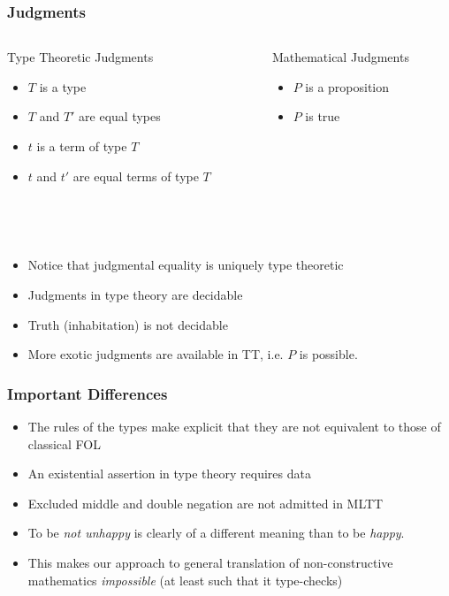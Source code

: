 \documentclass{beamer}
\begin{document}
\begin{frame}

\frametitle{Judgments}

\begin{columns}

\begin{column}{0.4 \textwidth}
\begin{block}{Type Theoretic Judgments}
  \begin{itemize}
  \item $T$ is a type
  \item $T$ and $T'$ are equal types
  \item $t$ is a term of type $T$
  \item $t$ and $t'$ are equal terms of type $T$
  \end{itemize}
\end{block}
\end{column}

\begin{column}{0.4 \textwidth}
\begin{block}{Mathematical Judgments}
  \begin{itemize}
  \item $P$ is a proposition
  \item $P$ is true
  \end{itemize}
\end{block}
\end{column}
\end{columns}

\\~\\
\begin{itemize}
  \item Notice that judgmental equality is uniquely type theoretic
  \item Judgments in type theory are decidable
  \item Truth (inhabitation) is not decidable
  \item More exotic judgments are available in TT, i.e. $P$ is possible.
\end{itemize}

\end{frame}


\begin{frame}

\frametitle{Important Differences}

\begin{itemize}
\item The rules of the types make explicit that they are not equivalent to those
  of classical FOL
\item An existential assertion in type theory requires data
\item Excluded middle and double negation are not admitted in MLTT
\item To be \emph{not unhappy} is clearly of a different meaning than to be \emph{happy}.
\item This makes our approach to general translation of non-constructive mathematics \emph{impossible}  (at least such that it type-checks)

\end{itemize}
\end{frame}
\end{document}
